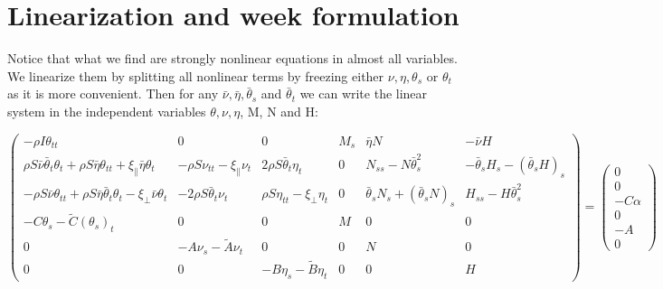 
\usepackage{pdfsync}
\usepackage{amsmath}
\usepackage{graphicx}

\section{Linearization and week formulation}

Notice that what we find are strongly nonlinear equations in almost all variables.
We linearize them by splitting all nonlinear terms by freezing either $\nu, \eta, \theta_s$ or $\theta_t$ as it is more convenient. Then for any $\bar{\nu}, \bar{\eta}, \bar{\theta}_s$ and $\bar{\theta}_t$ we can write the linear system in the independent variables $\theta, \nu, \eta$, M, N and H:

\[\begin{pmatrix}
-\rho I \theta_{tt} & 0 & 0 & M_s & \bar{\eta}N & -\bar{\nu}H \\
\rho S\bar{\nu}\bar{\theta}_t\theta_t + \rho S \bar{\eta}\theta_{tt} + \xi_{\parallel}\bar{\eta}\theta_t & -\rho S \nu_{tt} -\xi_{\parallel}\nu_t & 2 \rho S\bar{\theta}_t\eta_t & 0 & N_{ss} - N\bar{\theta}_s^2 & -\bar{\theta}_s H_s - (\bar{\theta}_s H)_s \\
-\rho S \bar{\nu}\theta_{tt} + \rho S \bar{\eta}\bar{\theta}_t\theta_t - \xi_{\perp}\bar{\nu}\theta_t & - 2\rho S \bar{\theta}_t \nu_t & \rho S \eta_{tt} - \xi_{\perp}\eta_t & 0 & \bar{\theta}_s N_s + (\bar{\theta}_s N)_s & H_{ss}-H\bar{\theta}_s^2 \\
-C\theta_s -\tilde{C}(\theta_s)_t& 0 & 0 & M & 0 & 0 \\
0 & -A\nu_s -\tilde{A}\nu_t & 0 & 0 & N & 0 \\
0 & 0 & -B\eta_s - \tilde{B}\eta_t & 0 & 0 & H 
\end{pmatrix}
=
\begin{pmatrix}
0\\
0\\
-C\alpha\\
0\\
-A\\
0
\end{pmatrix}\]


